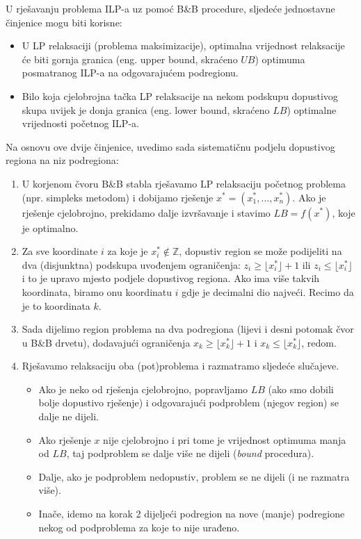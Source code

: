 \documentclass[a4paper, utf8, 11pt, colorlinks]{book}
\theoremstyle{definition}
\begin{document}
U rješavanju problema  ILP-a uz pomoć B\&B procedure, sljedeće jednostavne činjenice mogu biti korisne:
\begin{itemize}
    \item  U LP relaksaciji (problema 
           maksimizacije), optimalna vrijednost  relaksacije  će biti gornja granica (eng. upper bound, skraćeno $UB$) optimuma posmatranog ILP-a na odgovarajućem podregionu. 
    \item  Bilo koja cjelobrojna tačka LP relaksacije na nekom podskupu  
           dopustivog skupa uvijek je  donja granica (eng. lower bound, skraćeno $LB$) optimalne vrijednosti početnog ILP-a. 
\end{itemize}
Na osnovu ove dvije činjenice, uvedimo sada sistematičnu podjelu dopustivog regiona na niz podregiona:
\begin{enumerate}
    \item U korjenom čvoru B\&B stabla rješavamo LP relaksaciju početnog problema     (npr. simpleks metodom) i dobijamo rješenje $x^*=(x^*_1, \ldots, x^*_n)$.   Ako je rješenje cjelobrojno, prekidamo dalje izvršavanje i stavimo $LB=f(x^*)$, koje je optimalno. %
    \item Za sve koordinate $i$ za koje je $x^*_i \not \in \mathbb{Z}$, dopustiv region se može podijeliti na dva (disjunktna) podskupa uvođenjem ograničenja: $z_i \geq \lfloor x^*_i \rfloor + 1$ ili $z_i \leq \lfloor x^*_i \rfloor$ i to je upravo mjesto podjele dopustivog regiona. Ako ima više takvih koordinata, biramo onu koordinatu $i$ gdje je decimalni dio najveći.  Recimo da je to koordinata $k$.
    \item Sada dijelimo region problema na dva podregiona (lijevi i desni potomak čvor u B\&B drvetu), dodavajući 
          ograničenja $x_k \geq \lfloor x^*_k \rfloor + 1$ i $x_k \leq \lfloor x^*_k \rfloor$, redom.
    \item Rješavamo relaksaciju oba (pot)problema i razmatramo sljedeće slučajeve. 
    \begin{itemize}
    	\item  Ako je neko od rješenja cjelobrojno, popravljamo $LB$ (ako smo dobili bolje dopustivo rješenje) i odgovarajući podproblem (njegov region) se dalje ne dijeli. 
    	\item Ako rješenje $x$ nije cjelobrojno i pri tome je vrijednost optimuma manja od $LB$, taj podproblem se dalje više ne dijeli (\emph{bound} procedura). 
    	\item Dalje, ako je podproblem nedopustiv, problem se ne dijeli (i ne razmatra više). 
    	\item Inače, idemo na korak 2 dijeljeći podregion   na nove (manje) podregione nekog od podproblema za koje to nije urađeno.    
    \end{itemize}

\end{enumerate}
\end{document}
